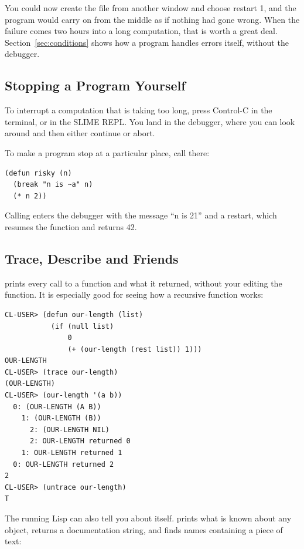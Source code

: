 You could now create the file from another window and choose restart
1, and the program would carry on from the middle as if nothing had
gone wrong. When the failure comes two hours into a long computation,
that is worth a great deal. Section~\ref{sec:conditions} shows how a
program handles errors itself, without the debugger.

\subsection{Stopping a Program Yourself}

To interrupt a computation that is taking too long, press Control-C in
the terminal, or  in the SLIME REPL. You land in the
debugger, where you can look around and then either continue or abort.

To make a program stop at a particular place, call  there:

\begin{verbatim}
(defun risky (n)
  (break "n is ~a" n)
  (* n 2))
\end{verbatim}

\noindent
Calling  enters the debugger with the message ``n is
21'' and a  restart, which resumes the function and
returns 42.

\subsection{Trace, Describe and Friends}

 prints every call to a function and what it returned,
without your editing the function. It is especially good for seeing
how a recursive function works:

\begin{verbatim}
CL-USER> (defun our-length (list)
           (if (null list)
               0
               (+ (our-length (rest list)) 1)))
OUR-LENGTH
CL-USER> (trace our-length)
(OUR-LENGTH)
CL-USER> (our-length '(a b))
  0: (OUR-LENGTH (A B))
    1: (OUR-LENGTH (B))
      2: (OUR-LENGTH NIL)
      2: OUR-LENGTH returned 0
    1: OUR-LENGTH returned 1
  0: OUR-LENGTH returned 2
2
CL-USER> (untrace our-length)
T
\end{verbatim}

The running Lisp can also tell you about itself.
 prints what is known about any object,
 returns a documentation string, and
 finds names containing a piece of text:

